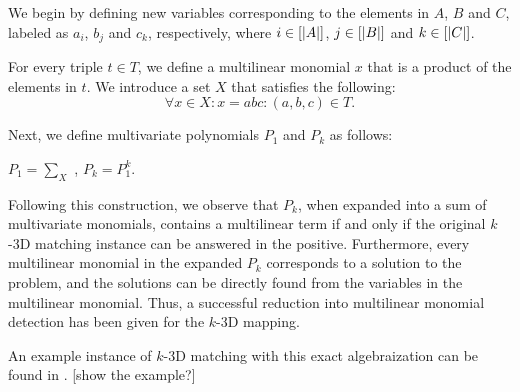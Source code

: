 \begin{problem}
\end{problem}

We begin by defining new variables corresponding to the elements in $A$, $B$ and $C$, 
labeled as $a_i$, $b_j$ and $c_k$, respectively, where $i\in [{\left\vert A\right\vert}]$, $j\in
[{\left\vert B\right\vert}]$ and $k\in [{\left\vert C\right\vert}]$. 

For every triple $t \in T$, we define a multilinear monomial $x$ that is a
product of the elements in $t$. 
We introduce a set $X$ that satisfies the following:
\[
\forall x \in X: x = abc : (a, b, c) \in T.
\]

Next, we define multivariate polynomials $P_1$ and $P_k$ as follows:
\begin{center}$P_1 = \displaystyle \sum_{X}$ ,   $P_k = P_1^k$.\end{center}

Following this construction, we observe that $P_k$, when expanded into a sum of multivariate monomials, 
contains a multilinear term if and only if the original $k$-3D matching instance can be answered in the positive. 
Furthermore, every multilinear monomial in the expanded $P_k$ corresponds to a solution to the problem, and 
the solutions can be directly found from the variables in the multilinear monomial. Thus, 
a successful reduction into multilinear monomial detection has been given for the $k$-3D mapping.

An example instance of $k$-3D matching with this exact algebraization can be found in \cite{KouWil15}. [show the example?]


